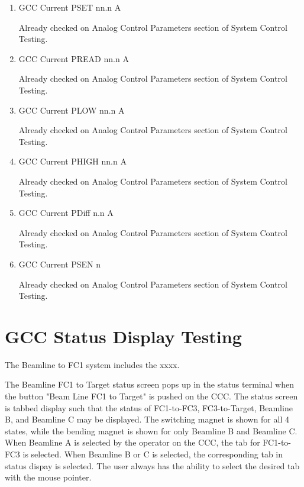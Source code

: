 \documentclass[11pt]{book}		%
\begin{document}
\begin{enumerate}
 \item GCC Current PSET   nn.n A

\color{red}
Already checked on Analog Control Parameters section of System Control Testing.
\color{black}

 \item GCC Current PREAD  nn.n A

\color{red}
Already checked on Analog Control Parameters section of System Control Testing.
\color{black}

 \item GCC Current PLOW   nn.n A

\color{red}
Already checked on Analog Control Parameters section of System Control Testing.
\color{black}

 \item GCC Current PHIGH  nn.n A

\color{red}
Already checked on Analog Control Parameters section of System Control Testing.
\color{black}

 \item GCC Current PDiff n.n A

\color{red}
Already checked on Analog Control Parameters section of System Control Testing.
\color{black}

 \item GCC Current PSEN  n

\color{red}
Already checked on Analog Control Parameters section of System Control Testing.
\color{black}

\end{enumerate}






\chapter{GCC Status Display Testing}

The Beamline to FC1 system includes the xxxx.

The Beamline FC1 to Target status screen pops up in the status terminal when the button "Beam Line FC1 to Target" is pushed on the CCC. The status screen is tabbed display such that the status of FC1-to-FC3, FC3-to-Target, Beamline B, and Beamline C may be displayed.  The switching magnet is shown for all 4 states, while the bending magnet is shown for only Beamline B and Beamline C.  When Beamline A is selected by the operator on the CCC, the tab for FC1-to-FC3 is selected. When Beamline B or C is selected, the corresponding tab in status dispay is selected. The user always has the ability to select the desired tab with the mouse pointer.
\end{document}
